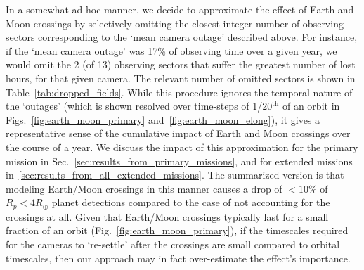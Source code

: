 In a somewhat ad-hoc manner, we decide to approximate the effect of Earth and Moon crossings by selectively omitting the closest integer number of observing sectors corresponding to the `mean camera outage' described above.
For instance, if the `mean camera outage' was 17\% of \tesss observing time over a given year, we would omit the 2 (of 13) observing sectors that suffer the greatest number of lost hours, for that given camera.
The relevant number of omitted sectors is shown in Table~\ref{tab:dropped_fields}.
While this procedure ignores the temporal nature of the `outages' (which is shown resolved over time-steps of 1/20$^\mathrm{th}$ of an orbit in Figs.~\ref{fig:earth_moon_primary} and~\ref{fig:earth_moon_elong}), it gives a representative sense of the cumulative impact of Earth and Moon crossings over the course of a year.
We discuss the impact of this approximation for the primary mission in Sec.~\ref{sec:results_from_primary_missions}, and for extended missions in~\ref{sec:results_from_all_extended_missions}.
The summarized version is that modeling Earth/Moon crossings in this manner causes a drop of $<10\%$ of $R_p < 4R_\oplus$ planet detections compared to the case of not accounting for the crossings at all.
Given that Earth/Moon crossings typically last for a small fraction of an orbit (Fig.~\ref{fig:earth_moon_primary}), if the timescales required for the cameras to `re-settle' after the crossings are small compared to orbital timescales, then our approach may in fact over-estimate the effect's importance.

